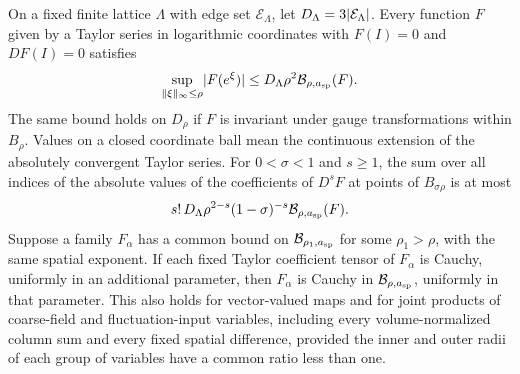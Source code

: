 \begin{lemma}\label{ch12:lem:reserved-tail}
On a fixed finite lattice $\Lambda$ with edge set $\mathcal E_\Lambda$, let $D_\Lambda=3\lvert \mathcal E_\Lambda\rvert$. Every function $F$ given by a Taylor series in logarithmic coordinates with $F(I)=0$ and $DF(I)=0$ satisfies
\[
 \sup_{\lVert \xi\rVert_\infty\le\rho}\lvert F(e^\xi)\rvert\le D_\Lambda\rho^2\mathcal B_{\rho,a_{\mathrm{sp}}}(F).
\]
The same bound holds on $D_\rho$ if $F$ is invariant under gauge transformations within $B_\rho$. Values on a closed coordinate ball mean the continuous extension of the absolutely convergent Taylor series. For $0<\sigma<1$ and $s\ge1$, the sum over all indices of the absolute values of the coefficients of $D^sF$ at points of $B_{\sigma\rho}$ is at most
\[
 s!\,D_\Lambda\rho^{2-s}(1-\sigma)^{-s}\mathcal B_{\rho,a_{\mathrm{sp}}}(F).
\]
Suppose a family $F_\alpha$ has a common bound on $\mathcal B_{\rho_1,a_{\mathrm{sp}}}$ for some $\rho_1>\rho$, with the same spatial exponent. If each fixed Taylor coefficient tensor of $F_\alpha$ is Cauchy, uniformly in an additional parameter, then $F_\alpha$ is Cauchy in $\mathcal B_{\rho,a_{\mathrm{sp}}}$, uniformly in that parameter. This also holds for vector-valued maps and for joint products of coarse-field and fluctuation-input variables, including every volume-normalized column sum and every fixed spatial difference, provided the inner and outer radii of each group of variables have a common ratio less than one.
\end{lemma}

